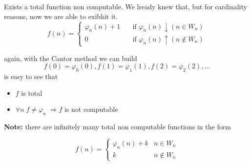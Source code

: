 \begin{exercise}
  Exists a total function non computable. We lready knew that, but for
  cardinality reasons, now we are able to exibhit it.
  \[
    f(n) = \begin{cases}

      \varphi_n(n) + 1 & \quad \mbox{if } \varphi_n(n) \downarrow (n
      \in W_n) \\

       0 & \quad \mbox{if } \varphi_n(n)\uparrow (n \notin W_n)
    \end{cases}
  \]

  again, with the Cantor method we can build
  \[f(0) = \varphi_0(0), f(1) = \varphi_1(1), f(2) = \varphi_2(2),
    \dots \]
  is easy to see that
  \begin{itemize}
  \item $f$ is total
  \item $\forall n \; f \neq \varphi_n \; \Rightarrow f$ is not
    computable
  \end{itemize}
\end{exercise}

\textbf{Note:} there are infinitely many total non computable
functions in the form

\[
  f(n)  = \begin{cases}
    \varphi_n(n) + k & n \in W_n \\
    k & n \notin W_n
  \end{cases}
\]

